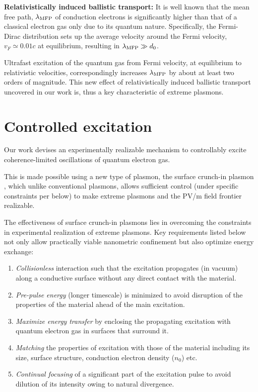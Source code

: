 \documentclass[aps,twocolumn,notitlepage,superscriptaddress]{revtex4-1}
\begin{document}
{\bf Relativistically induced ballistic transport:} It is well known that the mean free path, $\lambda_{\rm MFP}$ of conduction electrons is significantly higher than that of a classical electron gas only due to its quantum nature. Specifically, the Fermi-Dirac distribution sets up the average velocity around the Fermi velocity, $v_F\simeq0.01c$ at equilibrium, resulting in $\lambda_{\rm MFP}\gg d_0$.
 
Ultrafast excitation of the quantum gas from Fermi velocity, at equilibrium to relativistic velocities, correspondingly increases $\lambda_{\rm MFP}$ by about at least two orders of magnitude. This new effect of relativistically induced ballistic transport uncovered in our work is, thus a key characteristic of extreme plasmons. 

\section{Controlled excitation}
\label{sec:controlled-excitation}
Our work \cite{pct-2021} devises an experimentally realizable mechanism to controllably excite coherence-limited oscillations of quantum electron gas.

This is made possible using a new type of plasmon, the surface crunch-in plasmon \cite{ion-wake, crunch-in-regime}, which unlike conventional plasmons, allows sufficient control (under specific constraints per below) to make extreme plasmons and the PV/m field frontier realizable. 

The effectiveness of surface crunch-in plasmons lies in overcoming the constraints in experimental realization of extreme plasmons. Key requirements listed below not only allow practically viable nanometric confinement but also optimize energy exchange:
\begin{enumerate}[topsep=1pt, itemsep=0ex,partopsep=0ex,parsep=0ex]
\item {\em Collisionless} interaction such that the excitation propagates (in vacuum) along a conductive surface without  any direct contact with the material.
\item {\em Pre-pulse energy} (longer timescale) is minimized to avoid disruption of the properties of the material ahead of the main excitation.
\item {\em Maximize energy transfer} by enclosing the propagating excitation with quantum electron gas in surfaces that surround it.
\item {\em Matching} the properties of excitation with those of the material including its size, surface structure, conduction electron density ($n_0$) etc.
\item {\em Continual focusing} of a significant part of the excitation pulse to avoid dilution of its intensity owing to natural divergence.
\end{enumerate}
\end{document}
